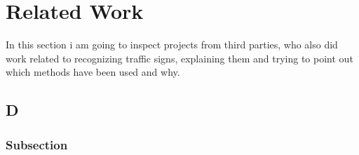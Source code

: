 
\chapter{Related Work}\label{chapter:Related Work}
In this section i am going to inspect projects from third parties, who also did work related to recognizing traffic signs, explaining them and trying to point out which methods have been used and why.
\section{D}


\subsection{Subsection}
